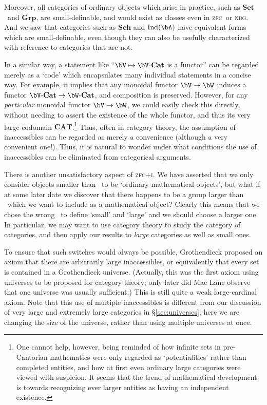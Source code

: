 \documentclass{amsart}
\newcommand{\Set}{\ensuremath{\mathbf{Set}}}
\def\zfc{\textsc{zfc}}
\def\zfci{\textsc{zfc+i}}
\def\nbg{\textsc{nbg}}
\begin{document}
Moreover, all categories of ordinary objects which arise in practice,
such as \Set\ and $\mathbf{Grp}$, are small-definable, and would exist
as classes even in \zfc\ or \nbg.  And we saw that categories such as
$\mathbf{Sch}$ and $\operatorname{Ind}(\bA)$ have equivalent forms
which are small-definable, even though they can also be usefully
characterized with reference to categories that are not.

In a similar way, a statement like
``$\bV\mapsto\bV\text{-}\mathbf{Cat}$ is a functor'' can be regarded
merely as a `code' which encapsulates many individual statements in a
concise way.  For example, it implies that any monoidal functor
$\bV\to\bW$ induces a functor $\bV\text{-}\mathbf{Cat}\to
\bW\text{-}\mathbf{Cat}$, and composition is preserved.  However, for
any \emph{particular} monoidal functor $\bV\to \bW$, we could easily
check this directly, without needing to assert the existence of the
whole functor, and thus its very large codomain
$\mathbf{CAT}$.\footnote{One cannot help, however, being reminded of
  how infinite sets in pre-Cantorian mathematics were only regarded as
  `potentialities' rather than completed entities, and how at first
  even ordinary large categories were viewed with suspicion.  It seems
  that the trend of mathematical development is towards recognizing
  ever larger entities as having an independent existence.}  Thus,
often in category theory, the assumption of inaccessibles can be
regarded as merely a convenience (although a very convenient one!).
Thus, it is natural to wonder under what conditions the use of
inaccessibles can be eliminated from categorical arguments.

There is another unsatisfactory aspect of \zfci.  We have asserted
that we only consider objects smaller than \ka\ to be `ordinary
mathematical objects', but what if at some later date we discover that
there happens to be a group larger than \ka\ which we want to include
as a mathematical object?  Clearly this means that we chose the wrong
\ka\ to define `small' and `large' and we should choose a larger one.
In particular, we may want to use category theory to study the
category of categories, and then apply our results to \emph{large}
categories as well as small ones.

To ensure that such switches would always be possible, Grothendieck
proposed an axiom that there are arbitrarily large inaccessibles, or
equivalently that every set is contained in a Grothendieck universe.
(Actually, this was the first axiom using universes to be proposed for
category theory; only later did Mac Lane observe that one universe was
usually sufficient.)  This is still quite a weak large-cardinal axiom.
Note that this use of multiple inaccessibles is different from our
discussion of very large and extremely large categories in
\S\ref{sec:universes}; here we are changing the size of the universe,
rather than using multiple universes at once.
\end{document}
